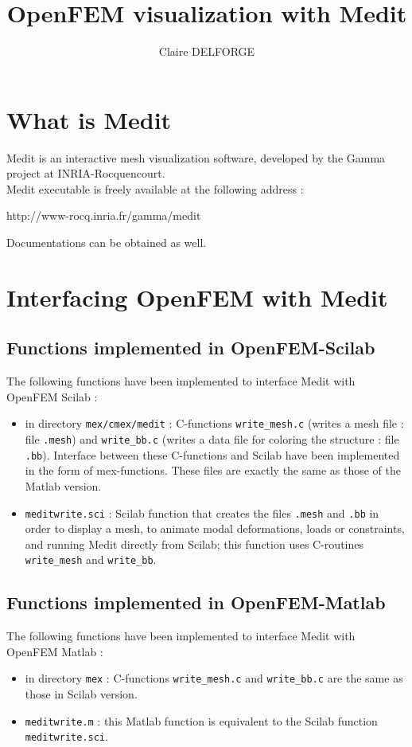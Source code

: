 \documentclass[a4paper]{article}
\author{Claire DELFORGE}
\title{OpenFEM visualization with Medit}
\date{ }
\begin{document}
\maketitle
\section{What is Medit}
Medit is an interactive mesh visualization software, developed by the Gamma project at INRIA-Rocquencourt.\\
Medit executable is freely available at the following address :
\begin{center} http://www-rocq.inria.fr/gamma/medit \end{center}
Documentations can be obtained as well.
\section{Interfacing OpenFEM with Medit}
\subsection{Functions implemented in OpenFEM-Scilab}
The following functions have been implemented to interface Medit with OpenFEM Scilab :
\begin{itemize}
\item in directory \verb+mex/cmex/medit+ : C-functions \verb+write_mesh.c+ (writes a mesh file : file \verb+.mesh+) and \verb+write_bb.c+ (writes a data file for coloring the structure : file \verb+.bb+). Interface between these C-functions and Scilab have been implemented in the form of mex-functions. These files are exactly the same as those of the Matlab version.  
\item \verb+meditwrite.sci+ : Scilab function that creates the files \verb+.mesh+ and \verb+.bb+ in order to display a mesh, to animate modal deformations, loads or constraints, and running Medit directly from Scilab; this function uses C-routines \verb+write_mesh+ and \verb+write_bb+.
\end{itemize}

\subsection{Functions implemented in OpenFEM-Matlab}
The following functions have been implemented to interface Medit with OpenFEM Matlab :
\begin{itemize}
\item in directory \verb+mex+ : C-functions \verb+write_mesh.c+ and \verb+write_bb.c+ are the same as those in Scilab version.
\item \verb+meditwrite.m+ : this Matlab function is equivalent to the Scilab function \verb+meditwrite.sci+.
\end{itemize}
\end{document}
